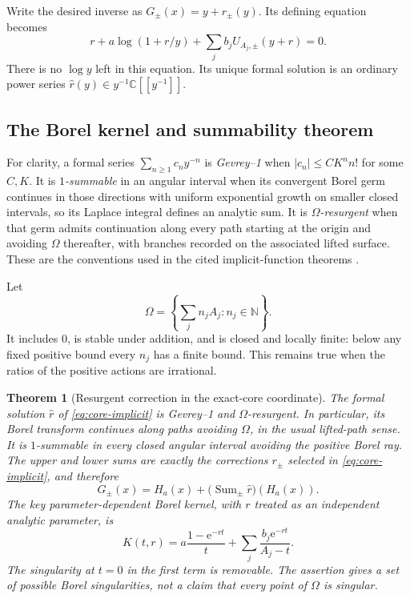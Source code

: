 \documentclass[11pt,a4paper]{article}
\numberwithin{equation}{section}
\newtheorem{theorem}{Theorem}[section]
\theoremstyle{definition}
\theoremstyle{remark}
\newcommand{\C}{\mathbb C}
\newcommand{\N}{\mathbb N}
\newcommand{\e}{\mathrm e}
\begin{document}
Write the desired inverse as $G_\pm(x)=y+r_\pm(y)$. Its defining equation becomes
\begin{equation}
 r+a\log(1+r/y)+\sum_jb_jU_{A_j,\pm}(y+r)=0.
 \label{eq:core-implicit}
\end{equation}
There is no $\log y$ left in this equation. Its unique formal solution is an ordinary power series
$\widehat r(y)\in y^{-1}\C[[y^{-1}]]$.

\subsection{The Borel kernel and summability theorem}
For clarity, a formal series $\sum_{n\geq1}c_ny^{-n}$ is \emph{Gevrey--1} when $|c_n|\leq CK^n n!$ for some $C,K$. It is \emph{$1$-summable} in an angular interval when its convergent Borel germ continues in those directions with uniform exponential growth on smaller closed intervals, so its Laplace integral defines an analytic sum. It is \emph{$\Omega$-resurgent} when that germ admits continuation along every path starting at the origin and avoiding $\Omega$ thereafter, with branches recorded on the associated lifted surface. These are the conventions used in the cited implicit-function theorems \cite{sauzin2015,sauzin2014}.

Let
\begin{equation}
 \Omega=\left\{\sum_jn_jA_j:n_j\in\N\right\}.
 \label{eq:Omega}
\end{equation}
It includes $0$, is stable under addition, and is closed and locally finite: below any fixed positive bound every $n_j$ has a finite bound. This remains true when the ratios of the positive actions are irrational.

\begin{theorem}[Resurgent correction in the exact-core coordinate]
\label{thm:core}
The formal solution $\widehat r$ of \eqref{eq:core-implicit} is Gevrey--1 and $\Omega$-resurgent. In particular, its Borel transform continues along paths avoiding $\Omega$, in the usual lifted-path sense. It is $1$-summable in every closed angular interval avoiding the positive Borel ray. The upper and lower sums are exactly the corrections $r_\pm$ selected in \eqref{eq:core-implicit}, and therefore
\begin{equation}
 G_\pm(x)=H_a(x)+
 \big(\operatorname{Sum}_{\pm}\widehat r\big)(H_a(x)).
 \label{eq:core-sum}
\end{equation}
The key parameter-dependent Borel kernel, with $r$ treated as an independent analytic parameter, is
\begin{equation}
 K(t,r)=a\frac{1-\e^{-rt}}{t}
       +\sum_j\frac{b_j\e^{-rt}}{A_j-t}.
 \label{eq:kernel}
\end{equation}
The singularity at $t=0$ in the first term is removable. The assertion gives a set of \emph{possible} Borel singularities, not a claim that every point of $\Omega$ is singular.
\end{theorem}
\end{document}
